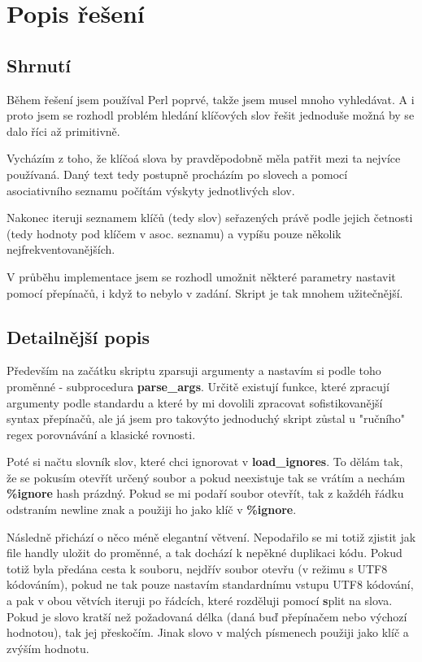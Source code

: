 \documentclass{article}
\author{Jan Rychlý}
\date{25. 11. 2020}
\def\cmd{\fontfamily{lmtt}\selectfont\textbf} %
\begin{document}
\section*{\huge Popis řešení}

\subsection*{Shrnutí}
\indent
\par Během řešení jsem používal Perl poprvé,
takže jsem musel mnoho vyhledávat. A i proto jsem se rozhodl
problém hledání klíčových slov řešit jednoduše možná by se dalo
říci až primitivně.

\par Vycházím z toho, že klíčoá slova by pravděpodobně měla
patřit mezi ta nejvíce používaná. Daný text tedy postupně procházím
po slovech a pomocí asociativního seznamu počítám výskyty
jednotlivých slov.

\par Nakonec iteruji seznamem klíčů (tedy slov) seřazených právě
podle jejich četnosti (tedy hodnoty pod klíčem v asoc. seznamu)
a vypíšu pouze několik nejfrekventovanějších.

\par V průběhu implementace jsem se rozhodl umožnit některé
parametry nastavit pomocí přepínačů, i když to nebylo v zadání.
Skript je tak mnohem užitečnější.

\subsection*{Detailnější popis}
\indent
\par Především na začátku skriptu zparsuji argumenty a nastavím
si podle toho proměnné - subprocedura {\cmd {parse\_args}}. Určitě
existují funkce, které zpracují argumenty podle standardu a které
by mi dovolili zpracovat sofistikovanější syntax přepínačů, ale
já jsem pro takovýto jednoduchý skript zůstal u "ručního"
regex porovnávání a klasické rovnosti.

\par Poté si načtu slovník slov, které chci ignorovat v
{\cmd{load\_ignores}}. To dělám tak, že se pokusím otevřít
určený soubor a pokud neexistuje tak se vrátím a nechám
{\cmd {\%ignore}} hash prázdný. Pokud se mi podaří soubor otevřít, 
tak z každéh řádku odstraním newline znak a použiji ho jako klíč
v {\cmd {\%ignore}}.

\par Následně přichází o něco méně elegantní větvení. Nepodařilo se
mi totiž zjistit jak file handly uložit do proměnné, a tak dochází
k nepěkné duplikaci kódu. Pokud totiž byla předána cesta k souboru,
nejdřív soubor otevřu (v režimu s UTF8 kódováním), pokud ne tak
pouze nastavím standardnímu vstupu UTF8 kódování, a pak v obou
větvích iteruji po řádcích, které rozděluji pomocí {\cmd split}
na slova. Pokud je slovo kratší než požadovaná délka (daná buď 
přepínačem nebo výchozí hodnotou), tak jej přeskočím. Jinak
slovo v malých písmenech použiji jako klíč a zvýším hodnotu.
\end{document}
